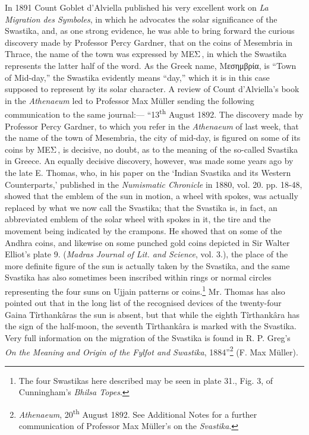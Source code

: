 \documentclass[a4paper, 11pt, oneside, polutonikogreek, english]{article}
\begin{document}
In 1891 Count Goblet d'Alviella published his very excellent work on \emph{La Migration des Symboles}, in which he advocates the solar significance of the Swastika, and, as one strong evidence, he was able to bring forward the curious discovery made by Professor Percy Gardner, that on the coins of Mesembria in Thrace, the name of the town was expressed by ΜΕΣ\,, in which the Swastika represents the latter half of the word. As the Greek name, Μεσημβρία, is ``Town of Mid-day,'' the Swastika evidently means ``day,'' which it is in this case supposed to represent by its solar character. A review of Count d'Alviella's book in the \emph{Athenaeum} led to Professor Max Müller sending the following communication to the same journal:--- ``13\textsuperscript{th} August 1892. The discovery made by Professor Percy Gardner, to which you refer in the \emph{Athenaeum} of last week, that the name of the town of Mesembria, the city of mid-day, is figured on some of its coins by ΜΕΣ\,, is decisive, no doubt, as to the meaning of the so-called Svastika in Greece. An equally decisive discovery, however, was made some years ago by the late E. Thomas, who, in his paper on the `Indian Svastika and its Western Counterparts,' published in the \emph{Numismatic Chronicle} in 1880, vol. 20. pp. 18-48, showed that the emblem of the sun in motion, a wheel with spokes, was actually replaced by what we now call the Svastika; that the Svastika is, in fact, an abbreviated emblem of the solar wheel with spokes in it, the tire and the movement being indicated by the crampons. He showed that on some of the Andhra coins, and likewise on some punched gold coins depicted in Sir Walter Elliot's plate 9. (\emph{Madras Journal of Lit. and Science}, vol. 3.), the place of the more definite figure of the sun is actually taken by the Svastika, and the same Svastika has also sometimes been inscribed within rings or normal circles representing the four suns on Ujjain patterns or coins.\footnote{The four Swastikas here described may be seen in plate 31., Fig. 3, of Cunningham's \emph{Bhilsa Topes}.} Mr. Thomas has also pointed out that in the long list of the recognised devices of the twenty-four Gaina Tîrthankâras the sun is absent, but that while the eighth Tîrthankâra has the sign of the half-moon, the seventh Tîrthankâra is marked with the Svastika. Very full information on the migration of the Svastika is found in R. P. Greg's \emph{On the Meaning and Origin of the Fylfot and Swastika}, 1884''\footnote{\emph{Athenaeum}, 20\textsuperscript{th} August 1892. See Additional Notes for a further communication of Professor Max Müller's on the \emph{Svastika}.} (F. Max Müller).
\end{document}
